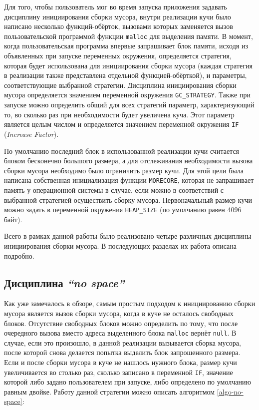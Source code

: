 \documentclass[14pt]{extarticle}
\begin{document}
Для того, чтобы пользователь мог во время запуска приложения задавать дисциплину 
инициирования
сборки мусора, внутри реализации кучи было написано несколько функций-обёрток, 
вызовами которых 
заменяется вызов пользовательской программой функции \texttt{malloc} для выделения памяти. 
В момент, когда
пользовательская программа впервые запрашивает блок памяти, исходя из объявленных
при запуске переменных окружения, определяется стратегия, которая будет использована 
для инициирования сборки мусора (каждая стратегия в реализации также представлена 
отдельной функцией-обёрткой), и параметры, соответствующие выбранной стратегии. 
Дисциплина инициирования сборки 
мусора определяется значением переменной окружения \texttt{GC\_STRATEGY}. Также при запуске 
можно определить общий для всех стратегий параметр, характеризующий то, во сколько раз
при необходимости будет увеличена куча. Этот параметр является целым числом
и определяется значением переменной окружения \texttt{IF}
(\textit{Increase Factor}). 

По умолчанию последний блок в использованной реализации кучи считается блоком бесконечно
большого размера, а для отслеживания необходимости вызова сборки мусора
необходимо было ограничить размер кучи. Для этой цели была написана собственная инициализация
функции \texttt{MORECORE}, которая не запрашивает память у операционной системы в случае, если можно
в соответствий с выбранной стратегией осуществить сборку мусора. Первоначальный размер кучи можно задать
в переменной окружения \texttt{HEAP\_SIZE} (по умолчанию равен 4096 байт).

Всего в рамках данной работы было реализовано четыре различных дисциплины
инициирования сборки мусора. В последующих разделах их работа описана подробно.

\subsection{Дисциплина \textit{``no space''}}
Как уже замечалось в обзоре, самым простым подходом к инициированию
сборки мусора является вызов сборки мусора, когда в куче не осталось 
свободных блоков. Отсутствие свободных блоков можно определить по тому,
что после очередного вызова вместо адреса выделенного блока \texttt{malloc} вернёт
\texttt{null}. В случае, если это произошло, в данной реализации вызывается сборка мусора,
после которой снова делается попытка выделить блок запрошенного размера.
Если и после сборки мусора в куче не нашлось нужного блока, размер кучи
увеличивается во столько раз, сколько записано в переменной \texttt{IF},
значение которой либо задано пользователем при запуске, либо определено
по умолчанию равным двойке.
Работу данной стратегии можно описать алгоритмом \ref{algo-no-space}:
\end{document}
